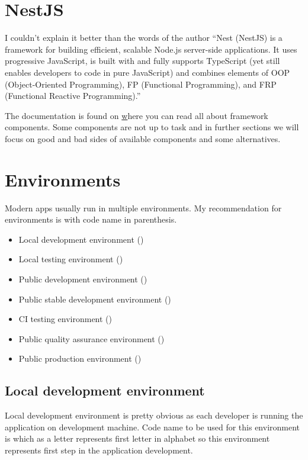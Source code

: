     \section{NestJS}\label{sec:nestjs}

    I couldn't explain it better than the words of the author ``Nest (NestJS) is a framework for building
    efficient, scalable Node.js server-side applications.
    It uses progressive JavaScript, is built with and fully supports
    TypeScript (yet still enables developers to code in pure JavaScript)
    and combines elements of OOP (Object-Oriented Programming),
    FP (Functional Programming), and FRP (Functional Reactive Programming).''

    The documentation is found on \href{https://docs.nestjs.com/} where you can
    read all about framework components.
    Some components are not up to task and in further sections we will focus on good and bad
    sides of available components and some alternatives.


    \section{Environments}\label{sec:environments}
    Modern apps usually run in multiple environments.
    My recommendation for environments is with code name in parenthesis.

    \begin{itemize}
        \item Local development environment ()
        \item Local testing environment ()
        \item Public development environment ()
        \item Public stable development environment ()
        \item CI testing environment ()
        \item Public quality assurance environment ()
        \item Public production environment ()
    \end{itemize}

    \subsection{Local development environment}\label{subsec:local-development-environment}
    Local development environment is pretty obvious as each developer is running the application on development machine.
    Code name to be used for this environment is  which as a letter represents first letter in alphabet
    so this environment represents first step in the application development.


